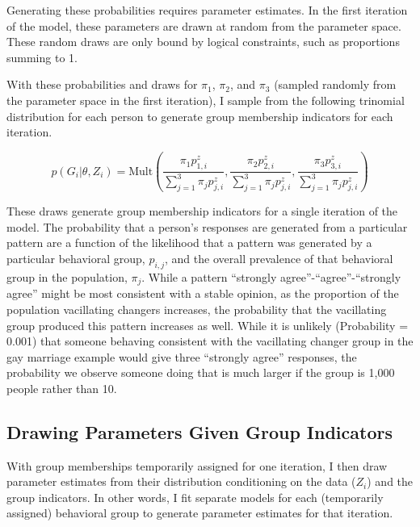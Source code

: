 \documentclass[12pt,]{article}
\begin{document}
Generating these probabilities requires parameter estimates. In the first iteration of the model, these parameters are drawn at random from the parameter space. These random draws are only bound by logical constraints, such as proportions summing to 1.

With these probabilities and draws for \(\pi_1\), \(\pi_2\), and \(\pi_3\) (sampled randomly from the parameter space in the first iteration), I sample from the following trinomial distribution for each person to generate group membership indicators for each iteration.

\begin{equation}
p(G_i|\theta,Z_i)=\text{Mult}\left(\frac{\pi_1p_{1,i}^z}{\sum_{j=1}^3\pi_jp_{j,i}^z},\frac{\pi_2p_{2,i}^z}{\sum_{j=1}^3\pi_jp_{j,i}^z},\frac{\pi_3p_{3,i}^z}{\sum_{j=1}^3\pi_jp_{j,i}^z}\right)
\end{equation}

These draws generate group membership indicators for a single iteration of the model. The probability that a person's responses are generated from a particular pattern are a function of the likelihood that a pattern was generated by a particular behavioral group, \(p_{i,j}\), and the overall prevalence of that behavioral group in the population, \(\pi_j\). While a pattern ``strongly agree''-``agree''-``strongly agree'' might be most consistent with a stable opinion, as the proportion of the population vacillating changers increases, the probability that the vacillating group produced this pattern increases as well. While it is unlikely (Probability = 0.001) that someone behaving consistent with the vacillating changer group in the gay marriage example would give three ``strongly agree'' responses, the probability we observe someone doing that is much larger if the group is 1,000 people rather than 10.

\hypertarget{drawing-parameters-given-group-indicators}{%
\subsection{Drawing Parameters Given Group Indicators}\label{drawing-parameters-given-group-indicators}}

With group memberships temporarily assigned for one iteration, I then draw parameter estimates from their distribution conditioning on the data (\(Z_i\)) and the group indicators. In other words, I fit separate models for each (temporarily assigned) behavioral group to generate parameter estimates for that iteration.
\end{document}

